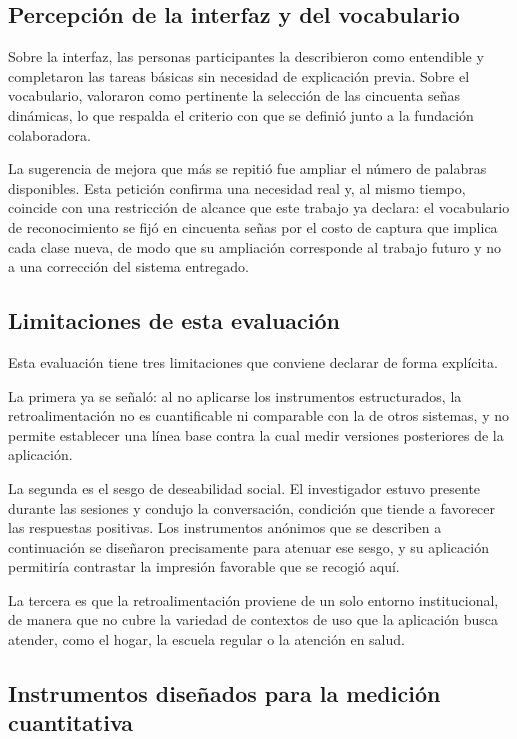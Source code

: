 \subsection{Percepción de la interfaz y del vocabulario}

Sobre la interfaz, las personas participantes la describieron como entendible y completaron las tareas básicas sin necesidad de explicación previa. Sobre el vocabulario, valoraron como pertinente la selección de las cincuenta señas dinámicas, lo que respalda el criterio con que se definió junto a la fundación colaboradora.

La sugerencia de mejora que más se repitió fue ampliar el número de palabras disponibles. Esta petición confirma una necesidad real y, al mismo tiempo, coincide con una restricción de alcance que este trabajo ya declara: el vocabulario de reconocimiento se fijó en cincuenta señas por el costo de captura que implica cada clase nueva, de modo que su ampliación corresponde al trabajo futuro y no a una corrección del sistema entregado.

\subsection{Limitaciones de esta evaluación}

Esta evaluación tiene tres limitaciones que conviene declarar de forma explícita.

La primera ya se señaló: al no aplicarse los instrumentos estructurados, la retroalimentación no es cuantificable ni comparable con la de otros sistemas, y no permite establecer una línea base contra la cual medir versiones posteriores de la aplicación.

La segunda es el sesgo de deseabilidad social. El investigador estuvo presente durante las sesiones y condujo la conversación, condición que tiende a favorecer las respuestas positivas. Los instrumentos anónimos que se describen a continuación se diseñaron precisamente para atenuar ese sesgo, y su aplicación permitiría contrastar la impresión favorable que se recogió aquí.

La tercera es que la retroalimentación proviene de un solo entorno institucional, de manera que no cubre la variedad de contextos de uso que la aplicación busca atender, como el hogar, la escuela regular o la atención en salud.

\subsection{Instrumentos diseñados para la medición cuantitativa}

